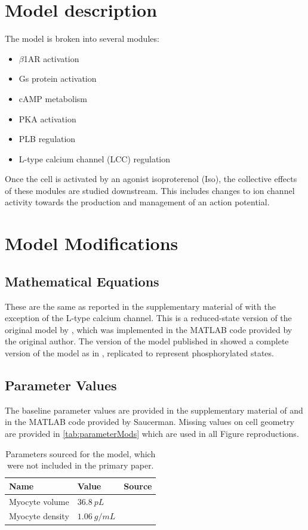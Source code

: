 \documentclass[fleqn,10pt]{physiome}
\begin{document}
\section{Model description}

The model is broken into several modules:
\begin{itemize}
    \item $\beta$1AR activation
    \item Gs protein activation
    \item cAMP metabolism
    \item PKA activation
    \item PLB regulation 
    \item L-type calcium channel (LCC) regulation 
\end{itemize}

Once the cell is activated by an agonist isoproterenol (Iso), the collective effects of these modules are studied downstream. This includes changes to ion channel activity towards the production and management of an action potential.


\section{Model Modifications}

\subsection{Mathematical Equations}
These are the same as reported in the supplementary material of \cite{saucerman2003} with the exception of the L-type calcium channel. 
This is a reduced-state version of the original model by \cite{jafri1998}, which was implemented in the MATLAB code provided by the original author. The version of the model published in \cite{saucerman2003} showed a complete version of the model as in \cite{jafri1998}, replicated to represent phosphorylated states.

\subsection{Parameter Values}
The baseline parameter values are provided in the supplementary material of \cite{saucerman2003} and in the MATLAB code provided by Saucerman. Missing values on cell geometry are provided in \autoref{tab:parameterMods} which are used in all Figure reproductions. 
\begin{table}[h]
    \centering
    \begin{tabular}{|l|l|l|}
    \hline
    Name & Value & Source\\
    \hline
    Myocyte volume & $36.8\ pL$ & \cite{bers2001}\\
    Myocyte density & $1.06\ g/mL$ & \cite{mendez1960}\\
    \hline
    \end{tabular}
    \caption{Parameters sourced for the model, which were not included in the primary paper.}
    \label{tab:parameterMods}
\end{table}
\end{document}
